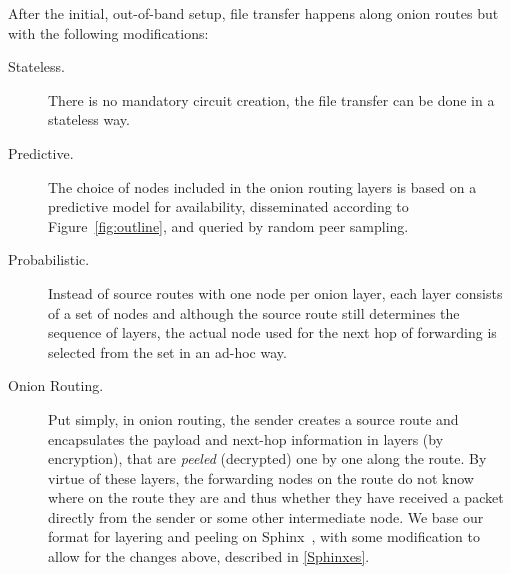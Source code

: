 After the initial, out-of-band setup, file transfer happens along
onion routes but with the following \name modifications:

\begin{description}
\item [Stateless.] There is no mandatory circuit creation, the file transfer can be
  done in a stateless way. 
\item [Predictive.] The choice of nodes included in the onion routing
  layers is based on a predictive model for availability, disseminated
  according to Figure~\cref{fig:outline}, and queried by random peer sampling.
\item [Probabilistic.] Instead of source routes with one node per onion layer, each
  layer consists of a set of nodes and although the source route still
  determines the sequence of layers, the actual node used for the next
  hop of forwarding is selected from the set in an ad-hoc way.
\item[Onion Routing.] Put simply, in onion routing, the sender creates
  a source route and 
  encapsulates the payload and next-hop information in layers (by
  encryption), that are \emph{peeled} (decrypted) one by one along the
  route. By virtue of these layers, the forwarding nodes on the
  route do not know where on the route they are and thus whether they
  have received a packet directly from the sender or some other
  intermediate node. We base our format for layering and peeling on
  Sphinx~\cite{Sphinx}, with some modification to allow for the
  changes above, described in \cref{Sphinxes}.
\end{description} 

